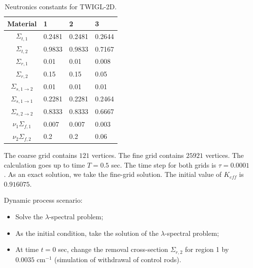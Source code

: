 \documentclass[preprint]{elsarticle}
\begin{document}
\begin{table}[ht]
\caption{\label{table:coeff}Neutronics constants for TWIGL-2D.}
	\label{twigl_const}
	\begin{center}
	\begin{tabular}{| c | l | l | l |}
		\hline
			Material 					& 1      & 2      & 3      \\
		\hline 
			$\Sigma_{t,1}$				& 0.2481 & 0.2481 & 0.2644 \\
			$\Sigma_{t,2}$				& 0.9833 & 0.9833 & 0.7167 \\
			$\Sigma_{r,1}$				& 0.01   & 0.01   & 0.008  \\
			$\Sigma_{r,2}$				& 0.15   & 0.15   & 0.05   \\	
			$\Sigma_{s,1\rightarrow2}$ 	& 0.01   & 0.01   & 0.01   \\
			$\Sigma_{s,1\rightarrow1}$	& 0.2281 & 0.2281 & 0.2464 \\
			$\Sigma_{s,2\rightarrow2}$	& 0.8333 & 0.8333 & 0.6667 \\
			$\nu_1\Sigma_{f,1}$			& 0.007  & 0.007  & 0.003  \\
			$\nu_2\Sigma_{f,2}$			& 0.2    & 0.2    & 0.06   \\
		\hline
	\end{tabular}
	\end{center}
\end{table}

The coarse grid contains $121$ vertices.
The fine grid contains $25921$ vertices.
The calculation goes up to time $T = 0.5$ sec.
The time step for both grids is $\tau = 0.0001$.
As an exact solution, we take the fine-grid solution.
The initial value of $K_{eff}$ is $0.916075$.

Dynamic process scenario:
\begin{itemize}
	\item Solve the $\lambda$-spectral problem;
	\item As the initial condition, take the solution of the $\lambda$-spectral problem;
	\item At time $t = 0$ sec, change the removal cross-section $\Sigma_{r,2}$ for region 1 by $0.0035$ cm$^{-1}$ (simulation of withdrawal of control rods).
\end{itemize}
\end{document}

